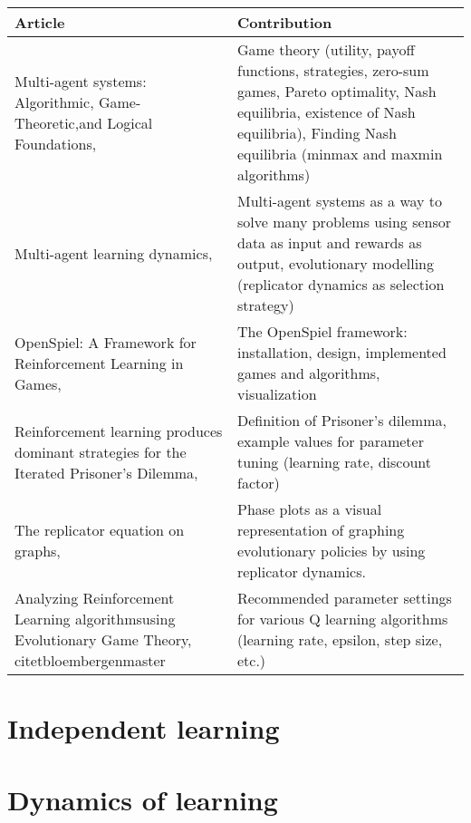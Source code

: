\documentclass[10pt,a4paper]{article}
\begin{document}
\bigskip
\begin{tabular}{|p{4cm}|p{9cm}|}
\hline 
Article & Contribution \\ 
\hline 
\hline
Multi-agent systems: Algorithmic, Game-Theoretic,and Logical Foundations, \citet{mas} & Game theory  (utility, payoff functions, strategies, zero-sum games, Pareto optimality, Nash equilibria, existence of Nash equilibria), Finding Nash equilibria (minmax and maxmin algorithms)  \\ 
\hline 
Multi-agent learning dynamics, \citet{phdthesis} &  Multi-agent systems as a way to solve many problems using sensor data as input and rewards as output, evolutionary modelling (replicator dynamics as selection strategy) \\
\hline 
OpenSpiel: A Framework for Reinforcement Learning in Games, \citet{lanctot2019openspiel} & The OpenSpiel framework: installation, design, implemented games and algorithms, visualization \\ 
\hline 
Reinforcement learning produces dominant strategies for the Iterated Prisoner’s Dilemma, \citet{rlforpd} & Definition of Prisoner's dilemma, example values for parameter tuning (learning rate, discount factor) \\ 
\hline 
The replicator equation on graphs, \citet{Ohtsuki2006TheRE} & Phase plots as a visual representation of graphing evolutionary policies by using replicator dynamics. \\
\hline
Analyzing Reinforcement Learning algorithmsusing Evolutionary Game Theory, citet{bloembergenmaster} & Recommended parameter settings for various Q learning algorithms (learning rate, epsilon, step size, etc.) \\
\end{tabular} 

\section{Independent learning}
\section{Dynamics of learning}


{}

\end{document}
